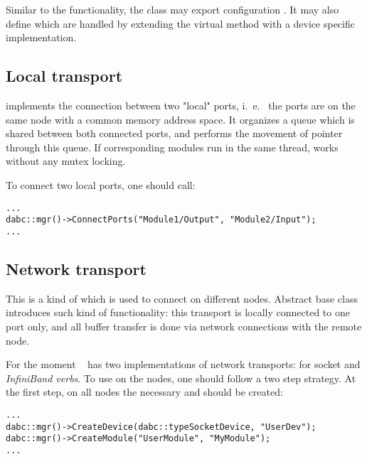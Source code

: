 Similar to the  functionality, the  class
may export configuration . It may also 
define  which are handled by extending the
virtual method  with a device specific
implementation.      
      

\subsection{Local transport}

 implements
the connection between two "local" ports,
i.~e.~ the ports are on the same node with a common memory address space.
It organizes a queue which is shared between both connected ports,
and performs the movement of  pointer through this queue.
If corresponding modules run in the same thread, 
 works without any mutex locking.

To connect two local ports, one should call:
\begin{small}
\begin{verbatim}
...
dabc::mgr()->ConnectPorts("Module1/Output", "Module2/Input");
...
\end{verbatim}     
\end{small}


\subsection{Network transport}

This is a kind of  which is used to 
connect  on different nodes.
Abstract base class  introduces such kind of 
functionality: this transport is locally connected  to one port only, 
and all buffer transfer is done
via network connections with the remote node. 

For the moment \dabc~ has two implementations of network transports: 
for socket and {\em InfiniBand verbs}.
To use  on the nodes, one should follow a two step strategy. 
At the first step, on all nodes the necessary  and  
should be created:
\begin{small}
\begin{verbatim}
...
dabc::mgr()->CreateDevice(dabc::typeSocketDevice, "UserDev");
dabc::mgr()->CreateModule("UserModule", "MyModule");
...
\end{verbatim}     
\end{small}

